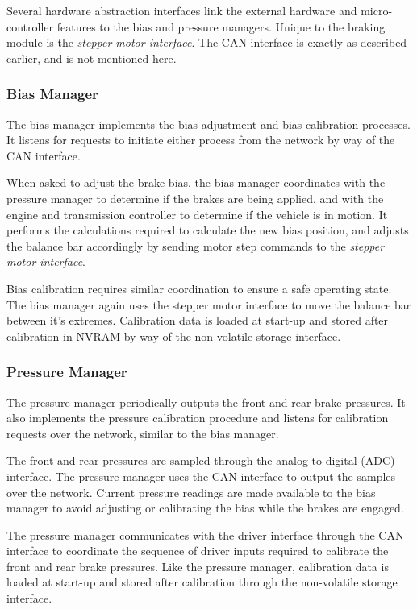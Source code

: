Several hardware abstraction interfaces link the external hardware and micro-controller features to the bias and pressure managers. Unique to the braking module is the \emph{stepper motor interface}. The CAN interface is exactly as described earlier, and is not mentioned here.

\subsubsection{Bias Manager}

The bias manager implements the bias adjustment and bias calibration processes. It listens for requests to initiate either process from the network by way of the CAN interface.

When asked to adjust the brake bias, the bias manager coordinates with the pressure manager to determine if the brakes are being applied, and with the engine and transmission controller to determine if the vehicle is in motion. It performs the calculations required to calculate the new bias position, and adjusts the balance bar accordingly by sending motor step commands to the \emph{stepper motor interface}.

Bias calibration requires similar coordination to ensure a safe operating state. The bias manager again uses the stepper motor interface to move the balance bar between it's extremes. Calibration data is loaded at start-up and stored after calibration in NVRAM by way of the non-volatile storage interface.

\subsubsection{Pressure Manager}

The pressure manager periodically outputs the front and rear brake pressures. It also implements the pressure calibration procedure and listens for calibration requests over the network, similar to the bias manager.

The front and rear pressures are sampled through the analog-to-digital (ADC) interface. The pressure manager uses the CAN interface to output the samples over the network. Current pressure readings are made available to the bias manager to avoid adjusting or calibrating the bias while the brakes are engaged.

The pressure manager communicates with the driver interface through the CAN interface to coordinate the sequence of driver inputs required to calibrate the front and rear brake pressures. Like the pressure manager, calibration data is loaded at start-up and stored after calibration through the non-volatile storage interface.

